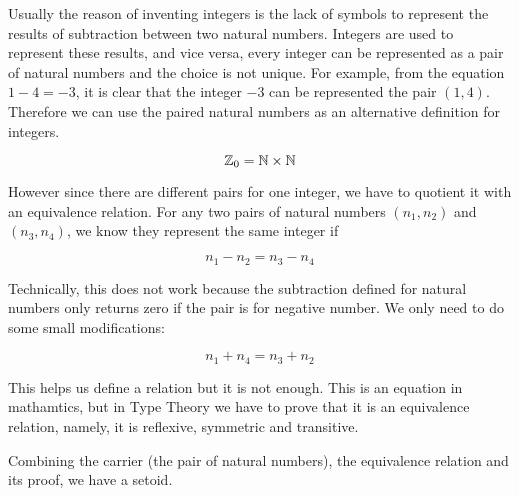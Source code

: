 Usually the reason of inventing integers is the lack of symbols to
represent the results of subtraction between two
natural numbers. Integers are used to represent these results, and
vice versa,
every integer can be represented as a pair of natural numbers and the
choice is not unique.
For example, from the equation $1 - 4 = - 3$, it is clear that the
integer $- 3$ can be represented the pair $(1,4)$. 
Therefore we can use the paired natural numbers as an alternative
definition for integers.

$$\mathbb{Z}_0=\mathbb{N} \times \mathbb{N}$$

However since there are different pairs for one integer, we have to
quotient it with an equivalence relation. For any two pairs of natural
numbers $(n_1, n_2)$ and $(n_3, n_4)$, we know they represent the same
integer if

$$ n_1 - n_2 = n_3 - n_4$$

Technically, this does not work because the subtraction defined for natural
numbers only returns zero if the pair is for negative number. We only
need to do some small modifications:

$$ n_1 + n_4 = n_3 + n_2$$

This helps us define a relation but it is not enough. This is an
equation in mathamtics, but in Type Theory we have to prove that it is an
equivalence relation, namely, it is reflexive, symmetric and transitive.

Combining the carrier (the pair of natural numbers), the equivalence
relation and its proof, we have a setoid.

\begin{code}
\\
\> \AgdaSymbol{:} \<%
\\
\> \AgdaSymbol{=} \<%
\\
\>[2]\<[3]%
\>[3]\AgdaSymbol{\{}  \<[19]%
\>[19]\AgdaSymbol{=} \<%
\\
\>[2]\<[3]%
\>[3]\AgdaSymbol{;}  \<[19]%
\>[19]\AgdaSymbol{=} \<%
\\
\>[2]\<[3]%
\>[3]\AgdaSymbol{;}  \AgdaSymbol{=} \<%
\\
\>[2]\<[3]%
\>[3]\AgdaSymbol{\}}\<%
\\
\end{code}

